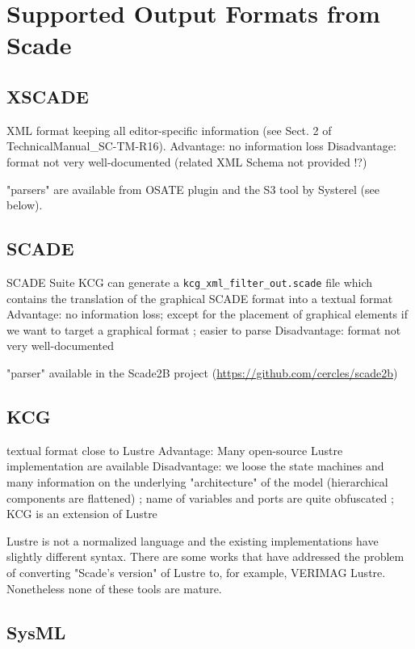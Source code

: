 \documentclass{template/openetcs_report}
\begin{document}

\chapter{Supported Output Formats from Scade}
\label{cha:supp-outp-form}

\section{XSCADE}

XML format keeping all editor-specific information (see Sect. 2 of
TechnicalManual\_SC-TM-R16).  Advantage: no information loss
Disadvantage: format not very well-documented (related XML Schema not
provided !?)

"parsers" are available from OSATE plugin and the S3 tool by Systerel (see below).

\section{SCADE}

SCADE Suite KCG can generate a \verb+kcg_xml_filter_out.scade+ file
which contains the translation of the graphical SCADE format into a
textual format Advantage: no information loss; except for the
placement of graphical elements if we want to target a graphical
format ; easier to parse Disadvantage: format not very well-documented

"parser" available in the Scade2B project (\url{https://github.com/cercles/scade2b})

\section{KCG}

textual format close to Lustre
Advantage: Many open-source Lustre implementation are available
Disadvantage: we loose the state machines and many information on the underlying "architecture" of the model (hierarchical components are flattened) ; name of variables and ports are quite obfuscated ; KCG is an extension of Lustre

Lustre is not a normalized language and the existing implementations have slightly different syntax. There are some works that have addressed the problem of converting "Scade's version" of Lustre to, for example, VERIMAG Lustre. Nonetheless none of these tools are mature.


\section{SysML}
\end{document}

